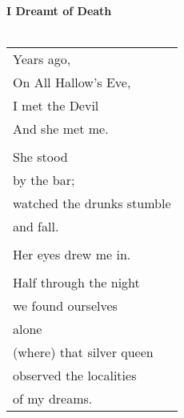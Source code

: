 \documentclass{article}
\begin{document}
\newcommand{\h}{\hspace{3ex}}
\newcommand{\hoar}{%
\begin{center}
\line(1,0){350}
\end{center}
}

\noindent
\textbf{I Dreamt of Death}\\\\
\begin{tabular}{l}
Years ago, \\
On All Hallow's Eve, \\
I met the Devil \\
And she met me. \\
\\
She stood \\
by the bar; \\
watched the drunks stumble \\
and fall. \\
\\
Her eyes drew me in. \\
\\
Half through the night \\
we found ourselves \\
alone \\
(where) that silver queen \\
observed the localities \\
of my dreams. \\
\end{tabular} \\
\end{document}

